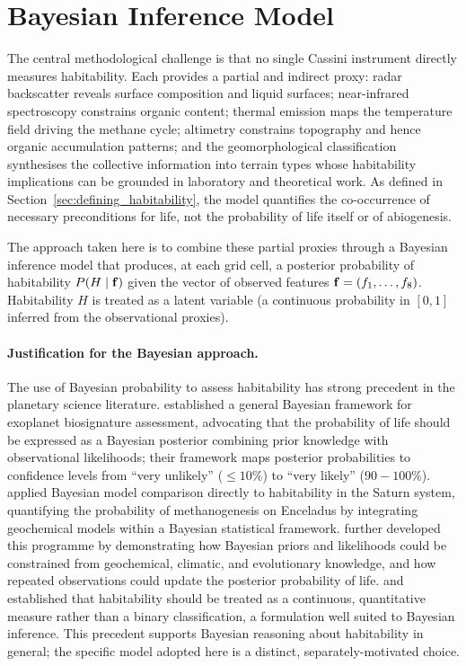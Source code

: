 \section{Bayesian Inference Model}
\label{sec:bayes}

The central methodological challenge is that no single Cassini instrument directly measures habitability.  Each provides a partial and indirect proxy: radar backscatter reveals surface composition and liquid surfaces; near-infrared spectroscopy constrains organic content; thermal emission maps the temperature field driving the methane cycle; altimetry constrains topography and hence organic accumulation patterns; and the geomorphological classification synthesises the collective information into terrain types whose habitability implications can be grounded in laboratory and theoretical work.  As defined in Section~\ref{sec:defining_habitability}, the model quantifies the co-occurrence of necessary preconditions for life, not the probability of life itself or of abiogenesis.

The approach taken here is to combine these partial proxies through a Bayesian inference model that produces, at each grid cell, a posterior probability of habitability $P(H \mid \mathbf{f})$ given the vector of observed features $\mathbf{f} = (f_1, \ldots, f_8)$.  Habitability $H$ is treated as a latent variable (a continuous probability in $[0,1]$ inferred from the observational proxies).

\paragraph{Justification for the Bayesian approach.}
The use of Bayesian probability to assess habitability has strong precedent in the planetary science literature.  \citet{Catling2018} established a general Bayesian framework for exoplanet biosignature assessment, advocating that the probability of life should be expressed as a Bayesian posterior combining prior knowledge with observational likelihoods; their framework maps posterior probabilities to confidence levels from ``very unlikely'' (${\leq}10\%$) to ``very likely'' ($90{-}100\%$).  \citet{Affholder2021} applied Bayesian model comparison directly to habitability in the Saturn system, quantifying the probability of methanogenesis on Enceladus by integrating geochemical models within a Bayesian statistical framework.  \citet{Walker2018} further developed this programme by demonstrating how Bayesian priors and likelihoods could be constrained from geochemical, climatic, and evolutionary knowledge, and how repeated observations could update the posterior probability of life.  \citet{Shock2007} and \citet{Mendez2021} established that habitability should be treated as a continuous, quantitative measure rather than a binary classification, a formulation well suited to Bayesian inference.  This precedent supports Bayesian reasoning about habitability in general; the specific model adopted here is a distinct, separately-motivated choice.

